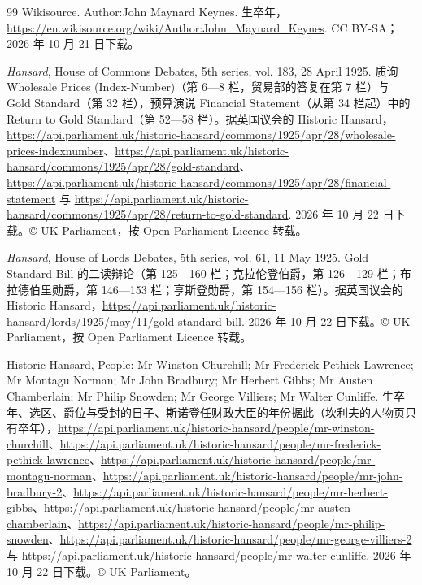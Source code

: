 \begin{thebibliography}{99}
 Wikisource. Author:John Maynard Keynes. 生卒年，\url{https://en.wikisource.org/wiki/Author:John_Maynard_Keynes}. CC BY-SA；2026 年 10 月 21 日下载。

 \emph{Hansard}, House of Commons Debates, 5th series, vol. 183, 28 April 1925. 质询 Wholesale Prices (Index-Number)（第 6—8 栏，贸易部的答复在第 7 栏）与 Gold Standard（第 32 栏），预算演说 Financial Statement（从第 34 栏起）中的 Return to Gold Standard（第 52—58 栏）。据英国议会的 Historic Hansard，\url{https://api.parliament.uk/historic-hansard/commons/1925/apr/28/wholesale-prices-indexnumber}、\url{https://api.parliament.uk/historic-hansard/commons/1925/apr/28/gold-standard}、\url{https://api.parliament.uk/historic-hansard/commons/1925/apr/28/financial-statement} 与 \url{https://api.parliament.uk/historic-hansard/commons/1925/apr/28/return-to-gold-standard}. 2026 年 10 月 22 日下载。© UK Parliament，按 Open Parliament Licence 转载。

 \emph{Hansard}, House of Lords Debates, 5th series, vol. 61, 11 May 1925. Gold Standard Bill 的二读辩论（第 125—160 栏；克拉伦登伯爵，第 126—129 栏；布拉德伯里勋爵，第 146—153 栏；亨斯登勋爵，第 154—156 栏）。据英国议会的 Historic Hansard，\url{https://api.parliament.uk/historic-hansard/lords/1925/may/11/gold-standard-bill}. 2026 年 10 月 22 日下载。© UK Parliament，按 Open Parliament Licence 转载。

 Historic Hansard, People: Mr Winston Churchill; Mr Frederick Pethick-Lawrence; Mr Montagu Norman; Mr John Bradbury; Mr Herbert Gibbs; Mr Austen Chamberlain; Mr Philip Snowden; Mr George Villiers; Mr Walter Cunliffe. 生卒年、选区、爵位与受封的日子、斯诺登任财政大臣的年份据此（坎利夫的人物页只有卒年），\url{https://api.parliament.uk/historic-hansard/people/mr-winston-churchill}、\url{https://api.parliament.uk/historic-hansard/people/mr-frederick-pethick-lawrence}、\url{https://api.parliament.uk/historic-hansard/people/mr-montagu-norman}、\url{https://api.parliament.uk/historic-hansard/people/mr-john-bradbury-2}、\url{https://api.parliament.uk/historic-hansard/people/mr-herbert-gibbs}、\url{https://api.parliament.uk/historic-hansard/people/mr-austen-chamberlain}、\url{https://api.parliament.uk/historic-hansard/people/mr-philip-snowden}、\url{https://api.parliament.uk/historic-hansard/people/mr-george-villiers-2} 与 \url{https://api.parliament.uk/historic-hansard/people/mr-walter-cunliffe}. 2026 年 10 月 22 日下载。© UK Parliament。


\end{thebibliography}
